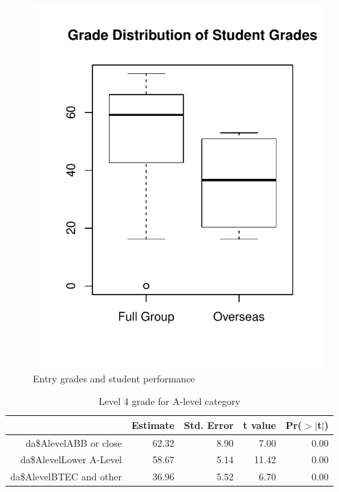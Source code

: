 \documentclass[12pt, a4paper, oneside]{article}\usepackage[]{graphicx}\usepackage[]{color}
\makeatletter
\def\maxwidth{ %
  \ifdim\Gin@nat@width>\linewidth
    \linewidth
  \else
    \Gin@nat@width
  \fi
}
\newenvironment{knitrout}{}{} %
\makeatother
\begin{document}
\begin{knitrout}
\color{fgcolor}\begin{figure}[]

\includegraphics[width=\maxwidth]{figure/boxplot2} \caption[Entry grades and student performance]{Entry grades and student performance\label{fig:boxplot2}}
\end{figure}


\end{knitrout}


\begin{table}[ht]
\centering
\begin{tabular}{rrrrr}
  \hline
 & Estimate & Std. Error & t value & Pr($>$$|$t$|$) \\ 
  \hline
da\$AlevelABB or close & 62.32 & 8.90 & 7.00 & 0.00 \\ 
  da\$AlevelLower A-Level & 58.67 & 5.14 & 11.42 & 0.00 \\ 
  da\$AlevelBTEC and other & 36.96 & 5.52 & 6.70 & 0.00 \\ 
   \hline
\end{tabular}
\caption{Level 4 grade for A-level category} 
\end{table}
\end{document}
